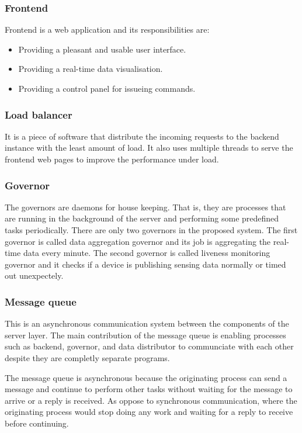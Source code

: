 \documentclass[../thesis.tex]{subfiles}
\begin{document}
\subsubsection{Frontend}

Frontend is a web application and its responsibilities are: 

\begin{itemize}
	\item Providing a pleasant and usable user interface.
	\item Providing a real-time data visualisation.
	\item Providing a control panel for issueing commands.
\end{itemize}

\subsubsection{Load balancer}

It is a piece of software that distribute the incoming requests to the backend instance with the least amount of load. It also uses multiple threads to serve the frontend web pages to improve the performance under load.

\subsubsection{Governor}

The governors are daemons for house keeping. That is, they are processes that are running in the background of the server and performing some predefined tasks periodically. There are only two governors in the proposed system. The first governor is called data aggregation governor and its job is aggregating the real-time data every minute. The second governor is called liveness monitoring governor and it checks if a device is publishing sensing data normally or timed out unexpectely. 

\subsubsection{Message queue}

This is an asynchronous communication system between the components of the server layer. The main contribution of the message queue is enabling processes such as backend, governor, and data distributor to communciate with each other despite they are completly separate programs. 

The message queue is asynchronous because the originating process can send a message and continue to perform other tasks without waiting for the message to arrive or a reply is received. As oppose to synchronous communication, where the originating process would stop doing any work and waiting for a reply to receive before continuing.
\end{document}
